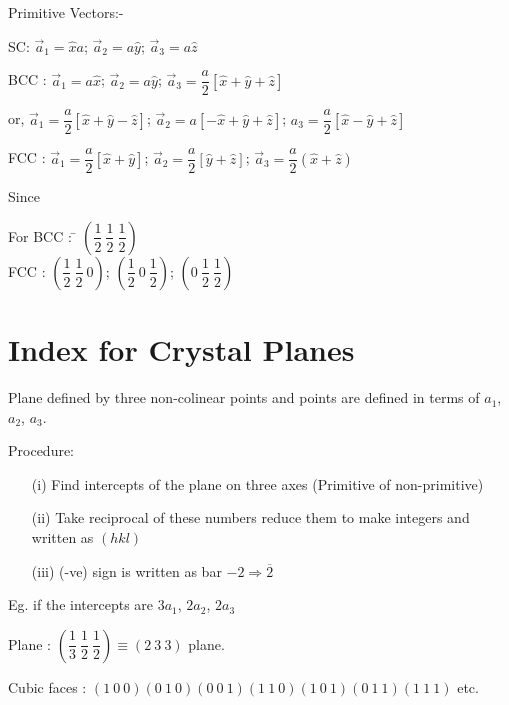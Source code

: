 \noindent
Primitive Vectors:-

\smallskip
\noindent
SC: $\overrightarrow{a}_{1}=\widehat{x}a$; $\overrightarrow{a}_{2}=a\widehat{y}$; $\overrightarrow{a}_{3}=a\widehat{z}$

\smallskip
\noindent
BCC : $\overrightarrow{a}_{1}=a\widehat{x}$; $\overrightarrow{a}_{2}=a\widehat{y}$; $\overrightarrow{a}_{3}=\dfrac{a}{2}\left[\widehat{x}+\widehat{y}+\widehat{z}\right]$

\smallskip
\noindent
or, $\overrightarrow{a}_{1}=\dfrac{a}{2}\left[\widehat{x}+\widehat{y}-\widehat{z}\right]$; $\overrightarrow{a}_{2}=a\left[-\widehat{x}+\widehat{y}+\widehat{z}\right]$; $a_{3}=\dfrac{a}{2}\left[\widehat{x}-\widehat{y}+\widehat{z}\right]$

\smallskip
\noindent
FCC : $\overrightarrow{a}_{1}=\dfrac{a}{2}\left[\widehat{x}+\widehat{y}\right]$; $\overrightarrow{a}_{2}=\dfrac{a}{2}\left[\widehat{y}+\widehat{z}\right]$; $\overrightarrow{a}_{3}=\dfrac{a}{2}(\widehat{x}+\widehat{z})$

\medskip
\noindent
Since \ 

\medskip

\begin{tabbing}
For BCC : \= $\left(\dfrac{1}{2} \ \dfrac{1}{2} \ \dfrac{1}{2}\right)$\\[5pt]
\phantom{For} FCC : \> $\left(\dfrac{1}{2} \ \dfrac{1}{2} \ 0\right)$; $\left(\dfrac{1}{2} \ 0 \ \dfrac{1}{2}\right)$; $\left(0 \ \dfrac{1}{2} \ \dfrac{1}{2}\right)$
\end{tabbing}

\section*{Index for Crystal Planes}

Plane defined by three non-colinear points and points are defined in terms of $a_{1}$, $a_{2}$, $a_{3}$.

Procedure:
\begin{itemize}
\item[(i)] Find intercepts of the plane on three axes (Primitive of non-primitive)

\item[(ii)] Take reciprocal of these numbers reduce them to make integers and written as $(hkl)$

\item[(iii)] (-ve) sign is written as bar $-2\Rightarrow \overline{2}$
\end{itemize}
Eg. if the intercepts are $3a_{1}$, $2a_{2}$, $2a_{3}$

Plane : $\left(\dfrac{1}{3} \ \dfrac{1}{2} \ \dfrac{1}{2}\right)\equiv (2 \ 3 \ 3)$ plane.

Cubic faces : $(1 \ 0 \ 0) (0 \ 1 \ 0) (0 \ 0 \ 1) (1 \ 1 \ 0)(1 \ 0 \ 1)(0 \ 1 \ 1)(1 \ 1 \ 1)$ etc.


